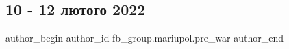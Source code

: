  
 
 
 
 

\subsection{10 - 12 лютого 2022}
\label{sec:13_02_2023.fb.fb_group.mariupol.pre_war.1.10___12_lyutogo_2022}

\ifcmt
 author_begin
   author_id fb_group.mariupol.pre_war
 author_end
\fi
